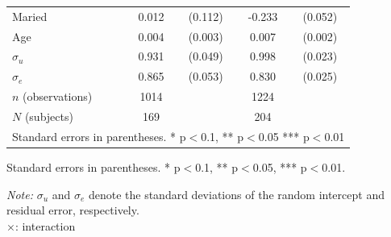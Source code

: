 \documentclass[12pt]{article}
\begin{document}
\begin{table}[H]
{\begin{tabular}{l*{2}{cc}}
Maried&       0.012         &     (0.112)&      -0.233\sym{***}&     (0.052)\\
Age         &       0.004         &     (0.003)&       0.007\sym{***}&     (0.002)\\
$\sigma_u$     &       0.931\sym{***}&     (0.049)&       0.998\sym{***}&     (0.023)\\
$\sigma_e$     &       0.865\sym{***}&     (0.053)&       0.830\sym{***}&     (0.025)\\
\hline
\(n\) (observations)       &        1014         &            &        1224         &            \\
\(N\) (subjects)      &        169         &            &        204         &            \\
\hline\hline
\multicolumn{5}{l}{\footnotesize Standard errors in parentheses. * p$<$0.1, ** p$<$0.05 *** p$<$0.01}\\
\end{tabular}
}





\begin{tablenotes}
            \footnotesize
            \item Standard errors in parentheses. * p$<$0.1, ** p$<$0.05, *** p$<$0.01.
            \item \textit{Note:} $\sigma_u$ and $\sigma_e$ denote the standard deviations of the random intercept and residual error, respectively.\\
            $\times$: interaction\\
        \end{tablenotes}
\end{table}
\end{document}
